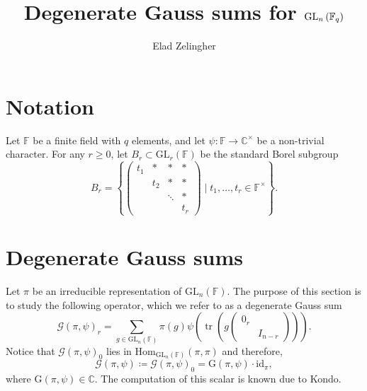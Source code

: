 \documentclass[12pt, reqno]{amsart}
\title{Degenerate Gauss sums for $\GL_n\left(\finiteField_q\right)$}
\author{Elad Zelingher}
\theoremstyle{definition}
\theoremstyle{definition}
\theoremstyle{definition}
\newcommand{\cComplex}{\mathbb{C}}
\newcommand{\multiplicativegroup}[1]{#1^{\times}}
\newcommand{\Hom}{\mathrm{Hom}}
\newcommand{\idmap}{\mathrm{id}}
\newcommand{\fieldCharacter}{\psi}
\newcommand{\IdentityMatrix}[1]{I_{#1}}
\newcommand{\trace}{\operatorname{tr}}
\newcommand{\GL}{\mathrm{GL}}
\newcommand{\finiteField}{\mathbb{F}}
\newcommand{\GaussSum}[2]{\mathcal{G}\left(#1, #2\right)}
\newcommand{\GaussSumScalar}[2]{\mathrm{G}\left(#1, #2\right)}
\begin{document}
\begin{abstract}
\end{abstract}
\maketitle

\section{Notation}
Let $\finiteField$ be a finite field with $q$ elements, and let $\fieldCharacter \colon \finiteField \to \multiplicativegroup{\cComplex}$ be a non-trivial character. For any $r \ge 0$, let $B_r \subset \GL_r\left(\finiteField\right)$ be the standard Borel subgroup
$$B_r = \left\{ \begin{pmatrix}
	t_1 & \ast & \ast & \ast\\
	& t_2 & \ast & \ast \\
	& & \ddots & \ast\\
	& & & t_r
\end{pmatrix} \mid t_1,\dots,t_r \in \multiplicativegroup{\finiteField} \right\}.$$

\section{Degenerate Gauss sums}
Let $\pi$ be an irreducible representation of $\GL_n\left(\finiteField\right)$. The purpose of this section is to study the following operator, which we refer to as a degenerate Gauss sum
$$\GaussSum{\pi}{\fieldCharacter}_r = \sum_{g \in \GL_n\left(\finiteField\right)} \pi\left(g\right) \fieldCharacter\left(\trace\left(g \begin{pmatrix}
	0_{r}\\
	& \IdentityMatrix{n-r}
\end{pmatrix}\right)\right).$$
Notice that $\GaussSum{\pi}{\fieldCharacter}_0$ lies in $\Hom_{\GL_n\left(\finiteField\right)}\left(\pi, \pi\right)$ and therefore, $$\GaussSum{\pi}{\fieldCharacter} \coloneqq \GaussSum{\pi}{\fieldCharacter}_0 = \GaussSumScalar{\pi}{\fieldCharacter} \cdot \idmap_\pi,$$
where $\GaussSumScalar{\pi}{\fieldCharacter} \in \cComplex$. The computation of this scalar is known due to Kondo.
\end{document}
